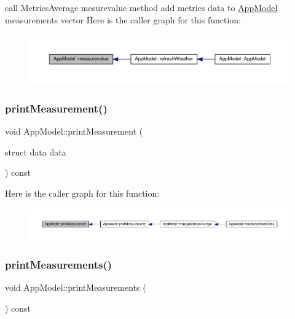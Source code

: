 call Metrics\+Average mesurevalue method add metrics data to \hyperlink{class_app_model}{App\+Model} measurements vector Here is the caller graph for this function\+:\nopagebreak
\begin{figure}[H]
\begin{center}
\leavevmode
\includegraphics[width=350pt]{class_app_model_a51e3556fa389b11c251a0a94f0a5655c_icgraph}
\end{center}
\end{figure}
\mbox{\label{class_app_model_a2bb0474a4f5f73ca23f9f72c97912192}} 
\subsubsection{\texorpdfstring{print\+Measurement()}{printMeasurement()}}
{\footnotesize\ttfamily void App\+Model\+::print\+Measurement (\begin{DoxyParamCaption}\item[{struct data data}]{ }\end{DoxyParamCaption}) const}

Here is the caller graph for this function\+:\nopagebreak
\begin{figure}[H]
\begin{center}
\leavevmode
\includegraphics[width=350pt]{class_app_model_a2bb0474a4f5f73ca23f9f72c97912192_icgraph}
\end{center}
\end{figure}
\mbox{\label{class_app_model_ac60073d6c96f7471f7227be130033399}} 
\subsubsection{\texorpdfstring{print\+Measurements()}{printMeasurements()}}
{\footnotesize\ttfamily void App\+Model\+::print\+Measurements (\begin{DoxyParamCaption}{ }\end{DoxyParamCaption}) const}

